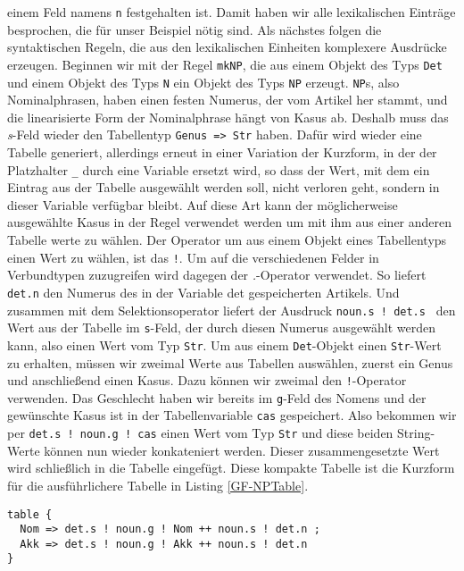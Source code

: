 \documentclass[fontsize=12pt,abstract=on,titlepage,bibliography=totoc,ngerman,listof=totoc]{scrreprt}
\begin{document}
einem Feld namens \texttt{n} festgehalten ist. Damit haben wir alle lexikalischen Einträge besprochen, die für unser Beispiel nötig sind. Als nächstes folgen die syntaktischen Regeln, die aus den lexikalischen Einheiten komplexere Ausdrücke erzeugen. Beginnen wir mit der Regel \texttt{mkNP}, die aus einem Objekt des Typs \texttt{Det} und einem Objekt des Typs \texttt{N} ein Objekt des Typs \texttt{NP} erzeugt. \texttt{NP}s, also Nominalphrasen, haben einen festen Numerus, der vom Artikel her stammt, und die linearisierte Form der Nominalphrase hängt von Kasus ab. Deshalb muss das \textit{s}-Feld wieder den Tabellentyp \texttt{Genus => Str} haben. Dafür wird wieder eine Tabelle generiert, allerdings erneut in einer Variation der Kurzform, in der der Platzhalter \texttt{\_} durch eine Variable ersetzt wird, so dass der Wert, mit dem ein Eintrag aus der Tabelle ausgewählt werden soll, nicht verloren geht, sondern in dieser Variable verfügbar bleibt. Auf diese Art kann der möglicherweise ausgewählte Kasus in der Regel verwendet werden um mit ihm aus einer anderen Tabelle werte zu wählen. Der Operator um aus einem Objekt eines Tabellentyps einen Wert zu wählen, ist das \texttt{!}. Um auf die verschiedenen Felder in Verbundtypen zuzugreifen wird dagegen der \textit{.}-Operator verwendet. So liefert \texttt{det.n} den Numerus des in der Variable det gespeicherten Artikels. Und zusammen mit dem Selektionsoperator liefert der Ausdruck \texttt{noun.s ! det.s } den Wert aus der Tabelle im \texttt{s}-Feld, der durch diesen Numerus ausgewählt werden kann, also einen Wert vom Typ \texttt{Str}. Um aus einem \texttt{Det}-Objekt einen \texttt{Str}-Wert zu erhalten, müssen wir zweimal Werte aus Tabellen auswählen, zuerst ein Genus und anschließend einen Kasus. Dazu können wir zweimal den \texttt{!}-Operator verwenden. Das Geschlecht haben wir bereits im \texttt{g}-Feld des Nomens und der gewünschte Kasus ist in der Tabellenvariable \texttt{cas} gespeichert. Also bekommen wir per \texttt{det.s ! noun.g ! cas} einen Wert vom Typ \texttt{Str} und diese beiden String-Werte können nun wieder konkateniert werden. Dieser zusammengesetzte Wert wird schließlich in die Tabelle eingefügt. Diese kompakte Tabelle ist die Kurzform für die ausführlichere Tabelle in Listing \ref{GF-NPTable}.
\begin{lstlisting}[float=ht,caption={Ausführliche Form der Tabelle in Zeile 13 des Listings \ref{GF-SatzGer}},label={GF-NPTable}]
table { 
  Nom => det.s ! noun.g ! Nom ++ noun.s ! det.n ; 
  Akk => det.s ! noun.g ! Akk ++ noun.s ! det.n 
}
\end{lstlisting}
\end{document}

